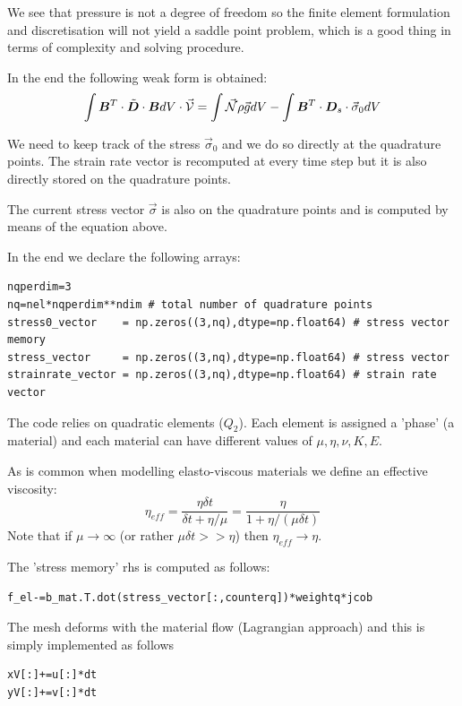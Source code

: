 We see that pressure is not a degree of freedom so the finite element
formulation and discretisation will not yield a saddle point problem, 
which is a good thing in terms of complexity and solving procedure.

In the end the following weak form is obtained:
\[
\int {\bm B}^T \cdot \tilde{\bm D} \cdot {\bm B} dV \cdot \vec{\cal V} 
= \int \vec{{\mathcal{N}}} \rho \vec{g} dV -\int {\bm B}^T \cdot {\bm D}_s \cdot \vec{\sigma}_0 dV
\]

We need to keep track of the stress $\vec{\sigma}_0$ and 
we do so directly at the quadrature points.
The strain rate vector is recomputed at every time step but it is also 
directly stored on the quadrature points.

The current stress vector $\vec{\sigma}$ is also on the quadrature points and
is computed by means of the equation above.

In the end we declare the following arrays:
\begin{lstlisting}
nqperdim=3
nq=nel*nqperdim**ndim # total number of quadrature points
stress0_vector    = np.zeros((3,nq),dtype=np.float64) # stress vector memory
stress_vector     = np.zeros((3,nq),dtype=np.float64) # stress vector 
strainrate_vector = np.zeros((3,nq),dtype=np.float64) # strain rate vector
\end{lstlisting}

The code relies on quadratic elements ($Q_2$).
Each element is assigned a 'phase' (a material) and 
each material can have different values of $\mu, \eta, \nu, K, E$.

As is common when modelling elasto-viscous materials
we define an effective viscosity:
\[
\eta_{eff} 
= \frac{\eta \delta t}{\delta t + \eta/\mu} 
= \frac{\eta }{1 + \eta/(\mu \delta t)} 
\]
Note that if $\mu\rightarrow \infty$ (or rather $\mu \delta t >> \eta$) 
then $\eta_{eff} \rightarrow \eta$. 





The 'stress memory' rhs is computed as follows:
\begin{lstlisting}
f_el-=b_mat.T.dot(stress_vector[:,counterq])*weightq*jcob
\end{lstlisting}



The mesh deforms with the material flow (Lagrangian approach)
and this is simply implemented as follows 

\begin{lstlisting}
xV[:]+=u[:]*dt
yV[:]+=v[:]*dt
\end{lstlisting}

